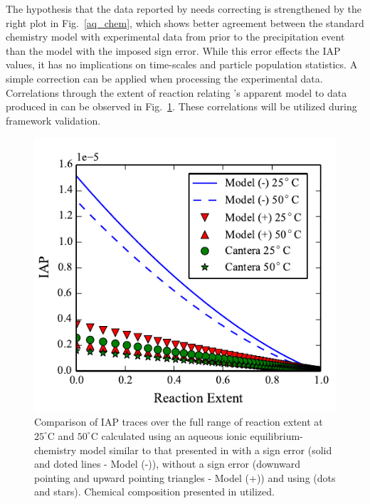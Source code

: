 \documentclass[preprint,3p,a4paper,times,12pt,authoryear]{elsarticle}
\begin{document}
The hypothesis that the data reported by \citeauthor{Ogino1987} needs correcting is strengthened by the right plot in Fig.~\ref{aq_chem}, which shows better agreement between the standard chemistry model with experimental data from \citet{Gebauer2008} prior to the precipitation event than the model with the imposed sign error.
While this error effects the IAP values, it has no implications on time-scales and particle population statistics.  A simple correction can be applied when processing the experimental data.
Correlations through the extent of reaction relating \citeauthor{Ogino1987}'s apparent model to data produced in \cite{Cantera} can be observed in Fig.~\ref{chem_corr}. These correlations will be utilized during framework validation.  

\begin{figure}[h!tb]
\begin{center}
\includegraphics{fig_2_Chemistry_Correlation.pdf} 
\caption{Comparison of IAP traces over the full range of reaction extent at $25^{\circ}$C and $50^{\circ}$C calculated using an aqueous ionic equilibrium-chemistry model similar to that presented in \cite{Ogino1987} with a sign error (solid and doted lines - Model (-)), without a sign error (downward pointing and upward pointing triangles - Model (+)) and using \cite{Cantera} (dots and stars).  Chemical composition presented in \cite{Ogino1987} utilized.}
\label{chem_corr}
\end{center}
\end{figure}
\end{document}
